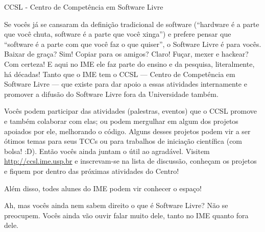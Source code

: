 \begin{secao}{CCSL - Centro de Competência em Software Livre}

Se vocês já se cansaram da definição tradicional de software (``hardware é a
parte que você chuta, software é a parte que você xinga'') e prefere pensar que
``software é a parte com que você faz o que quiser'', o Software Livre é para
vocês. Baixar de graça? Sim! Copiar para os amigos? Claro! Fuçar, mexer e
hackear? Com certeza! E aqui no IME ele faz parte do ensino e da pesquisa,
literalmente, há décadas! Tanto que o IME tem o CCSL — Centro de Competência em
Software Livre — que existe para dar apoio a essas atividades internamente e
promover a difusão do Software Livre fora da Universidade também.

Vocês podem participar das atividades (palestras, eventos) que o CCSL
promove e também colaborar com elas; ou podem mergulhar em algum dos
projetos apoiados por ele, melhorando o código. Alguns desses projetos
podem vir a ser ótimos temas para seus TCCs ou para trabalhos de
iniciação científica (com bolsa! :D). Então vocês ainda juntam o útil ao
agradável. Visitem \url{http://ccsl.ime.usp.br} e inscrevam-se na lista de discussão,
conheçam os projetos e fiquem por dentro das próximas atividades do
Centro! 

Além disso, todes alunes do IME podem vir conhecer o espaço!

Ah, mas vocês ainda nem sabem direito o que é Software Livre? Não se preocupem.
Vocês ainda vão ouvir falar muito dele, tanto no IME quanto fora dele.

\end{secao}
